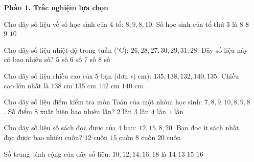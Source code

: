 \textbf{Phần 1. Trắc nghiệm lựa chọn}

\begin{ex} %
Cho dãy số liệu về số học sinh của 4 tổ: $8, 9, 8, 10$. Số học sinh của tổ thứ 3 là
\choice
{$8$}
{\True $8$}
{$9$}
{$10$}
\end{ex}

\begin{ex} %
Cho dãy số liệu nhiệt độ trong tuần ($^\circ\text{C}$): $26, 28, 27, 30, 29, 31, 28$. Dãy số liệu này có bao nhiêu số?
\choice
{$5$ số}
{$6$ số}
{\True $7$ số}
{$8$ số}
\end{ex}

\begin{ex} %
Cho dãy số liệu chiều cao của 5 bạn (đơn vị $\text{cm}$): $135, 138, 132, 140, 135$. Chiều cao lớn nhất là
\choice
{$138\text{ cm}$}
{$135\text{ cm}$}
{$142\text{ cm}$}
{\True $140\text{ cm}$}
\end{ex}

\begin{ex} %
Cho dãy số liệu điểm kiểm tra môn Toán của một nhóm học sinh: $7, 8, 9, 10, 8, 9, 8$. Số điểm 8 xuất hiện bao nhiêu lần?
\choice
{$2$ lần}
{\True $3$ lần}
{$4$ lần}
{$1$ lần}
\end{ex}

\begin{ex} %
Cho dãy số liệu số sách đọc được của 4 bạn: $12, 15, 8, 20$. Bạn đọc ít sách nhất đọc được bao nhiêu cuốn?
\choice
{$12$ cuốn}
{$15$ cuốn}
{\True $8$ cuốn}
{$20$ cuốn}
\end{ex}

\begin{ex} %
Số trung bình cộng của dãy số liệu: $10, 12, 14, 16, 18$ là
\choice
{\True $14$}
{$13$}
{$15$}
{$16$}
\end{ex}

